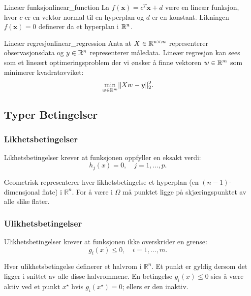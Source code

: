 \begin{example}{Lineær funksjon}{linear_function}
	La \(f(\symbf{x}) = c^T\symbf{x} + d\) være en lineær funksjon, hvor \(c\) er en vektor normal til en hyperplan og \(d\) er en konstant. Likningen \(f(\symbf{x}) = 0\) definerer da et hyperplan i \(\mathbb{R}^n\).
\end{example}

\begin{example}{Lineær regresjon}{linear_regression}
	Anta at \(X \in \mathbb{R}^{n \times m}\) representerer observasjonsdata og \(y \in \mathbb{R}^n\) representerer måledata. Lineær regresjon kan sees som et lineært optimeringsproblem der vi ønsker å finne vektoren \(w \in \mathbb{R}^m\) som minimerer kvadratavviket:
	\begin{equation*}
		\min_{w \in \mathbb{R}^m} \lVert Xw - y\rVert_2^2.
	\end{equation*}
\end{example}



\subsection{Typer Betingelser}

\subsubsection{Likhetsbetingelser}
Likhetsbetingelser krever at funksjonen oppfyller en eksakt verdi:
\begin{equation*}
	h_j(x) = 0, \quad j = 1,\ldots,p.
\end{equation*}

Geometrisk representerer hver likhetsbetingelse et hyperplan (en \((n-1)\)-dimensjonal flate) i \( \mathbb{R}^n \). For å være i \( \Omega \) må punktet ligge på skjæringspunktet av alle slike flater.

\subsubsection{Ulikhetsbetingelser}
Ulikhetsbetingelser krever at funksjonen ikke overskrider en grense:
\begin{equation*}
	g_i(x) \leq 0, \quad i = 1,\ldots,m.
\end{equation*}

Hver ulikhetsbetingelse definerer et halvrom i \( \mathbb{R}^n \). Et punkt er gyldig dersom det ligger i snittet av alle disse halvrommene. En betingelse \( g_i(x) \leq 0 \) sies å være aktiv ved et punkt \( x^\star \) hvis \( g_i(x^\star) = 0 \); ellers er den inaktiv.

